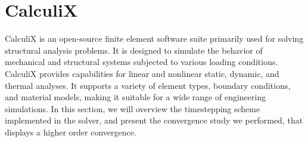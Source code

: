 \documentclass[
  english,        %
  font=times,     %
  onecolumn,      %
]{tumarticle}
\begin{document}
\section{CalculiX}
CalculiX is an open-source finite element software suite primarily used for solving structural analysis problems. It is designed to simulate the behavior of mechanical and structural systems subjected to various loading conditions. CalculiX provides capabilities for linear and nonlinear static, dynamic, and thermal analyses. It supports a variety of element types, boundary conditions, and material models, making it suitable for a wide range of engineering simulations. In this section, we will overview the timestepping scheme implemented in the solver, and present the convergence study we performed, that displays a higher order convergence. 
\end{document}
